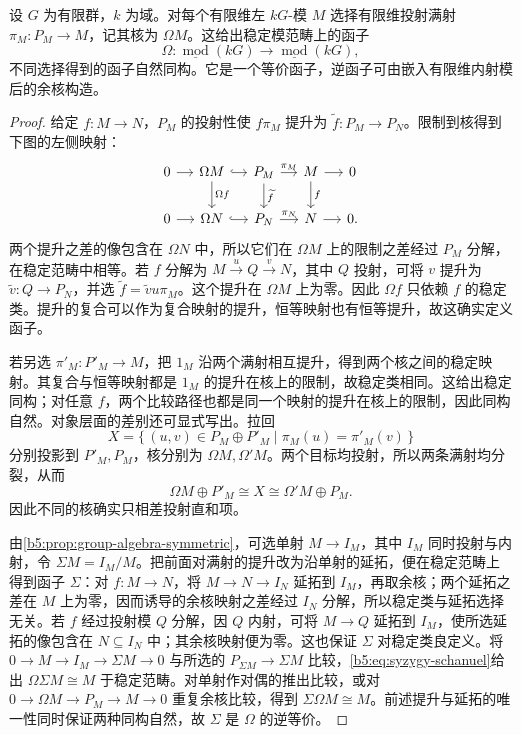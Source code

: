 \begin{proposition}\label{b5:prop:stable-syzygy-functor}
	设 \(G\) 为有限群，\(k\) 为域。对每个有限维左 \(kG\)-模 \(M\) 选择有限维投射满射 \(\pi_M:P_M\to M\)，记其核为 \(\Omega M\)。这给出稳定模范畴上的函子
	\[
		\Omega:\underline{\operatorname{mod}}(kG)
		\longrightarrow\underline{\operatorname{mod}}(kG),
	\]
	不同选择得到的函子自然同构。它是一个等价函子，逆函子可由嵌入有限维内射模后的余核构造。
\end{proposition}
\begin{proof}
	给定 \(f:M\to N\)，\(P_M\) 的投射性使 \(f\pi_M\) 提升为 \(\widetilde f:P_M\to P_N\)。限制到核得到下图的左侧映射：
	\[
		\begin{tikzcd}[column sep=small]
			0\arrow[r]&\Omega M\arrow[r,hook]\arrow[d,"\Omega f"]&P_M\arrow[r,"\pi_M"]\arrow[d,"\widetilde f"]&M\arrow[r]\arrow[d,"f"]&0\\
			0\arrow[r]&\Omega N\arrow[r,hook]&P_N\arrow[r,"\pi_N"]&N\arrow[r]&0.
		\end{tikzcd}
	\]
	两个提升之差的像包含在 \(\Omega N\) 中，所以它们在 \(\Omega M\) 上的限制之差经过 \(P_M\) 分解，在稳定范畴中相等。若 \(f\) 分解为 \(M\xrightarrow{u}Q\xrightarrow{v}N\)，其中 \(Q\) 投射，可将 \(v\) 提升为 \(\widetilde v:Q\to P_N\)，并选 \(\widetilde f=\widetilde v u\pi_M\)。这个提升在 \(\Omega M\) 上为零。因此 \(\Omega f\) 只依赖 \(f\) 的稳定类。提升的复合可以作为复合映射的提升，恒等映射也有恒等提升，故这确实定义函子。

	若另选 \(\pi'_M:P'_M\to M\)，把 \(1_M\) 沿两个满射相互提升，得到两个核之间的稳定映射。其复合与恒等映射都是 \(1_M\) 的提升在核上的限制，故稳定类相同。这给出稳定同构；对任意 \(f\)，两个比较路径也都是同一个映射的提升在核上的限制，因此同构自然。对象层面的差别还可显式写出。拉回
	\[
		X=\{\,(u,v)\in P_M\oplus P'_M\mid \pi_M(u)=\pi'_M(v)\,\}
	\]
	分别投影到 \(P'_M,P_M\)，核分别为 \(\Omega M,\Omega' M\)。两个目标均投射，所以两条满射均分裂，从而
	\begin{equation}\label{b5:eq:syzygy-schanuel}
		\Omega M\oplus P'_M\cong X\cong\Omega'M\oplus P_M.
	\end{equation}
	因此不同的核确实只相差投射直和项。

	由\cref{b5:prop:group-algebra-symmetric}，可选单射 \(M\to I_M\)，其中 \(I_M\) 同时投射与内射，令 \(\Sigma M=I_M/M\)。把前面对满射的提升改为沿单射的延拓，便在稳定范畴上得到函子 \(\Sigma\)：对 \(f:M\to N\)，将 \(M\to N\to I_N\) 延拓到 \(I_M\)，再取余核；两个延拓之差在 \(M\) 上为零，因而诱导的余核映射之差经过 \(I_N\) 分解，所以稳定类与延拓选择无关。若 \(f\) 经过投射模 \(Q\) 分解，因 \(Q\) 内射，可将 \(M\to Q\) 延拓到 \(I_M\)，使所选延拓的像包含在 \(N\subseteq I_N\) 中；其余核映射便为零。这也保证 \(\Sigma\) 对稳定类良定义。将 \(0\to M\to I_M\to\Sigma M\to0\) 与所选的 \(P_{\Sigma M}\to\Sigma M\) 比较，\eqref{b5:eq:syzygy-schanuel}给出 \(\Omega\Sigma M\cong M\) 于稳定范畴。对单射作对偶的推出比较，或对 \(0\to\Omega M\to P_M\to M\to0\) 重复余核比较，得到 \(\Sigma\Omega M\cong M\)。前述提升与延拓的唯一性同时保证两种同构自然，故 \(\Sigma\) 是 \(\Omega\) 的逆等价。
\end{proof}

